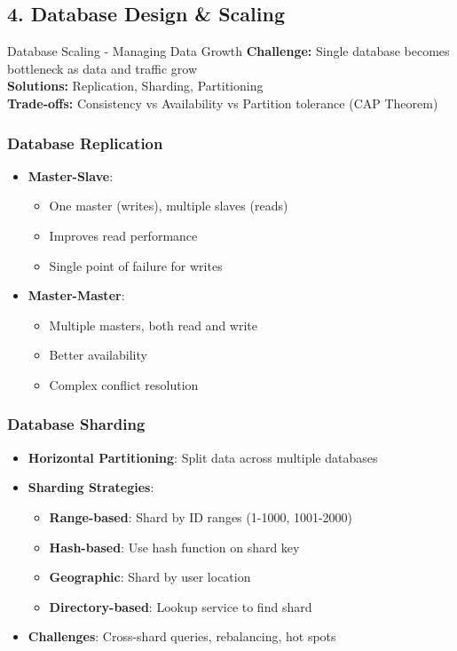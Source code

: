 \documentclass[10pt,a4paper]{article}
\begin{document}
\subsection{4. Database Design \& Scaling}

\begin{conceptbox}{Database Scaling - Managing Data Growth}
\textbf{Challenge:} Single database becomes bottleneck as data and traffic grow\\
\textbf{Solutions:} Replication, Sharding, Partitioning\\
\textbf{Trade-offs:} Consistency vs Availability vs Partition tolerance (CAP Theorem)
\end{conceptbox}

\subsubsection{Database Replication}
\begin{itemize}
\item \textbf{Master-Slave}:
  \begin{itemize}
  \item One master (writes), multiple slaves (reads)
  \item Improves read performance
  \item Single point of failure for writes
  \end{itemize}
\item \textbf{Master-Master}:
  \begin{itemize}
  \item Multiple masters, both read and write
  \item Better availability
  \item Complex conflict resolution
  \end{itemize}
\end{itemize}

\subsubsection{Database Sharding}
\begin{itemize}
\item \textbf{Horizontal Partitioning}: Split data across multiple databases
\item \textbf{Sharding Strategies}:
  \begin{itemize}
  \item \textbf{Range-based}: Shard by ID ranges (1-1000, 1001-2000)
  \item \textbf{Hash-based}: Use hash function on shard key
  \item \textbf{Geographic}: Shard by user location
  \item \textbf{Directory-based}: Lookup service to find shard
  \end{itemize}
\item \textbf{Challenges}: Cross-shard queries, rebalancing, hot spots
\end{itemize}
\end{document}

